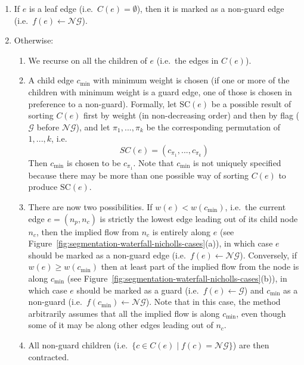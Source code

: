 \documentclass[preprint,a4paper]{elsarticle}
\begin{document}
\begin{enumerate}

\item If $e$ is a leaf edge (i.e.~$C(e) = \emptyset$), then it is marked as a non-guard edge (i.e.~$f(e) \leftarrow \mathcal{NG}$).

\item Otherwise:

\begin{enumerate}

\item We recurse on all the children of $e$ (i.e.~the edges in $C(e)$).

\item A child edge $c_{\min}$ with minimum weight is chosen (if one or more of the children with minimum weight is a guard edge, one of those is chosen in preference to a non-guard). Formally, let $\mbox{SC}(e)$ be a possible result of sorting $C(e)$ first by weight (in non-decreasing order) and then by flag ($\mathcal{G}$ before $\mathcal{NG}$), and let $\pi_1,...,\pi_k$ be the corresponding permutation of $1,...,k$, i.e.
%
\[
SC(e) = (c_{\pi_1},...,c_{\pi_k})
\]
%
Then $c_{\min}$ is chosen to be $c_{\pi_1}$. Note that $c_{\min}$ is not uniquely specified because there may be more than one possible way of sorting $C(e)$ to produce $\mbox{SC}(e)$.

\item There are now two possibilities. If $w(e) < w(c_{\min})$, i.e.~the current edge $e = (n_p,n_c)$ is strictly the lowest edge leading out of its child node $n_c$, then the implied flow from $n_c$ is entirely along $e$ (see Figure~\ref{fig:segmentation-waterfall-nicholls-cases}(a)), in which case $e$ should be marked as a non-guard edge (i.e.~$f(e) \leftarrow \mathcal{NG}$). Conversely, if $w(e) \ge w(c_{\min})$ then at least part of the implied flow from the node is along $c_{\min}$ (see Figure~\ref{fig:segmentation-waterfall-nicholls-cases}(b)), in which case $e$ should be marked as a guard (i.e.~$f(e) \leftarrow \mathcal{G}$) and $c_{\min}$ as a non-guard (i.e.~$f(c_{\min}) \leftarrow \mathcal{NG}$). Note that in this case, the method arbitrarily assumes that all the implied flow is along $c_{\min}$, even though some of it may be along other edges leading out of $n_c$.

\item All non-guard children (i.e.~$\{c \in C(e) \; | \; f(c) = \mathcal{NG}\}$) are then contracted.

\end{enumerate}

\end{enumerate}
\end{document}

